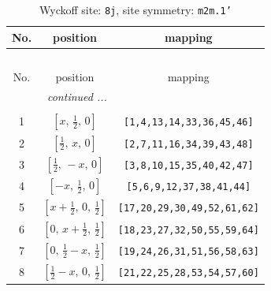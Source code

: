 \documentclass[fleqn,8pt]{jsarticle}
\begin{document}
\begin{longtable}{ccc}
\caption{Wyckoff site: {\tt 8j}, site symmetry: {\tt m2m.1'}}
 \\
 \hline \hline
No. & position & mapping \\ \hline \endfirsthead

\multicolumn{2}{l}{\tablename\ \thetable{}} \\
 \hline \hline
No. & position & mapping \\ \hline \endhead

 \hline \hline
\multicolumn{2}{r}{\footnotesize\it continued ...} \\ \endfoot

 \hline \hline
\multicolumn{2}{r}{} \\ \endlastfoot

1 & $\left[ x,\, \frac{1}{2},\, 0 \right]$ & {\tt [1,4,13,14,33,36,45,46]} \\ \hline
2 & $\left[ \frac{1}{2},\, x,\, 0 \right]$ & {\tt [2,7,11,16,34,39,43,48]} \\ \hline
3 & $\left[ \frac{1}{2},\, - x,\, 0 \right]$ & {\tt [3,8,10,15,35,40,42,47]} \\ \hline
4 & $\left[ - x,\, \frac{1}{2},\, 0 \right]$ & {\tt [5,6,9,12,37,38,41,44]} \\ \hline
5 & $\left[ x + \frac{1}{2},\, 0,\, \frac{1}{2} \right]$ & {\tt [17,20,29,30,49,52,61,62]} \\ \hline
6 & $\left[ 0,\, x + \frac{1}{2},\, \frac{1}{2} \right]$ & {\tt [18,23,27,32,50,55,59,64]} \\ \hline
7 & $\left[ 0,\, \frac{1}{2} - x,\, \frac{1}{2} \right]$ & {\tt [19,24,26,31,51,56,58,63]} \\ \hline
8 & $\left[ \frac{1}{2} - x,\, 0,\, \frac{1}{2} \right]$ & {\tt [21,22,25,28,53,54,57,60]} \\
\end{longtable}
\renewcommand{\arraystretch}{1.2}
\end{document}
